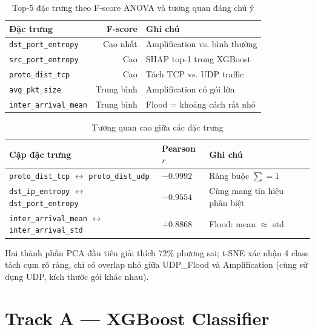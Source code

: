 \documentclass[12pt,a4paper]{article}
\begin{document}
\begin{table}[H]
\centering
\caption{Top-5 đặc trưng theo F-score ANOVA và tương quan đáng chú ý}
\label{tab:anova}
\begin{tabular}{lrp{7cm}}
\toprule
\textbf{Đặc trưng} & \textbf{F-score} & \textbf{Ghi chú} \\
\midrule
\texttt{dst\_port\_entropy}  & Cao nhất & Amplification vs. bình thường \\
\texttt{src\_port\_entropy}  & Cao       & SHAP top-1 trong XGBoost \\
\texttt{proto\_dist\_tcp}    & Cao       & Tách TCP vs. UDP traffic \\
\texttt{avg\_pkt\_size}      & Trung bình & Amplification có gói lớn \\
\texttt{inter\_arrival\_mean}& Trung bình & Flood = khoảng cách rất nhỏ \\
\bottomrule
\end{tabular}
\end{table}

\begin{table}[H]
\centering
\caption{Tương quan cao giữa các đặc trưng}
\label{tab:corr}
\begin{tabular}{llll}
\toprule
\textbf{Cặp đặc trưng} & \textbf{Pearson $r$} & \textbf{Ghi chú} \\
\midrule
\texttt{proto\_dist\_tcp} $\leftrightarrow$ \texttt{proto\_dist\_udp}   & $-0.9992$ & Ràng buộc $\sum = 1$ \\
\texttt{dst\_ip\_entropy} $\leftrightarrow$ \texttt{dst\_port\_entropy} & $-0.9554$ & Cùng mang tín hiệu phân biệt \\
\texttt{inter\_arrival\_mean} $\leftrightarrow$ \texttt{inter\_arrival\_std} & $+0.8868$ & Flood: mean $\approx$ std \\
\bottomrule
\end{tabular}
\end{table}

Hai thành phần PCA đầu tiên giải thích 72\% phương sai; t-SNE xác nhận 4 class tách cụm rõ ràng, chỉ có overlap nhỏ giữa UDP\_Flood và Amplification (cùng sử dụng UDP, kích thước gói khác nhau).

\section{Track A --- XGBoost Classifier}
\end{document}
